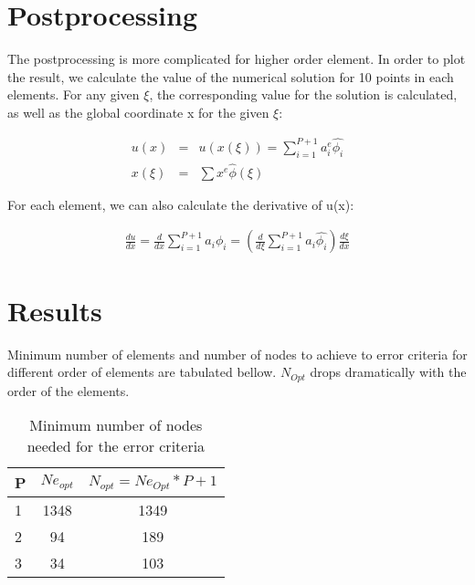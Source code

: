 \documentclass[paper=a4, fontsize=11pt]{article} %
\begin{document}
\section{Postprocessing}
The postprocessing is more complicated for higher order element. In order to plot the result, we calculate the value of the numerical solution for 10 points in each elements. For any given $\xi$, the corresponding value for the solution is calculated, as well as the global coordinate x for the given $\xi$:

\begin{eqnarray}
 u(x) &=& u(x(\xi))=\sum_{i=1}^{P+1} a_i^e \hat{\phi_i}\nonumber\\
 x(\xi) &=& \sum x^e \hat{\phi}(\xi)
 \end{eqnarray} 

For each element, we can also calculate the derivative of u(x):

\begin{eqnarray}
\frac{du}{dx} = \frac{d}{dx} \sum_{i=1}^{P+1} a_i \phi_i = (\frac{d}{d\xi}\sum_{i=1}^{P+1} a_i \hat{\phi_i})\frac{d\xi}{dx}
\end{eqnarray}


\section{Results}

Minimum number of elements and number of nodes to achieve to error criteria for different order of elements are tabulated bellow. $N_{Opt}$ drops dramatically with the order of the elements. 
\begin{table}
\begin{center}
  \begin{tabular}{ l | c | c}
    \hline
    P & $Ne_{opt}$ & $N_{opt} = Ne_{Opt} * P + 1 $\\ \hline
    1 & 1348 & 1349\\ \hline
    2 &  94 & 189\\ \hline
    3 & 34 & 103\\ \hline
    \hline
  \end{tabular}
  \caption{Minimum number of nodes needed for the error criteria}
\end{center}
\end{table}
\end{document}
